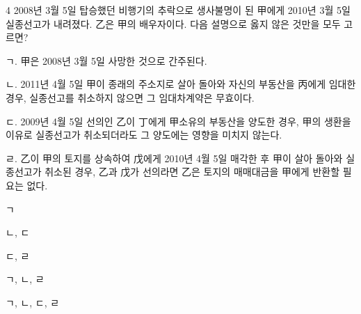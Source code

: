 \begin{question}{4}
2008년 3월 5일 탑승했던 비행기의 추락으로 생사불명이 된 甲에게 2010년 3월 5일 실종선고가 내려졌다. 乙은 甲의 배우자이다. 다음 설명으로 옳지 않은 것만을 모두 고르면?
\begin{framedtext}
ㄱ. 甲은 2008년 3월 5일 사망한 것으로 간주된다. \par
ㄴ. 2011년 4월 5일 甲이 종래의 주소지로 살아 돌아와 자신의 부동산을 丙에게 임대한 경우, 실종선고를 취소하지 않으면 그 임대차계약은 무효이다. \par
ㄷ. 2009년 4월 5일 선의인 乙이 丁에게 甲소유의 부동산을 양도한 경우, 甲의 생환을 이유로 실종선고가 취소되더라도 그 양도에는 영향을 미치지 않는다. \par
ㄹ. 乙이 甲의 토지를 상속하여 戊에게 2010년 4월 5일 매각한 후 甲이 살아 돌아와 실종선고가 취소된 경우, 乙과 戊가 선의라면 乙은 토지의 매매대금을 甲에게 반환할 필요는 없다.
\end{framedtext}
\begin{choices}
  \item ㄱ
  \item ㄴ, ㄷ
  \item ㄷ, ㄹ
  \item ㄱ, ㄴ, ㄹ
  \item ㄱ, ㄴ, ㄷ, ㄹ
\end{choices}
\end{question}
